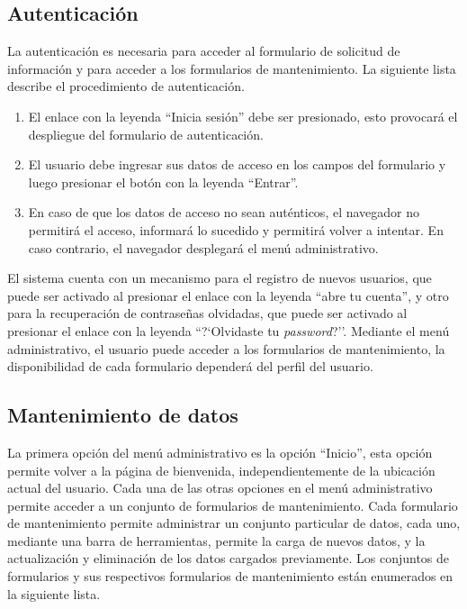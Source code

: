 \documentclass[a4paper, 9pt, conference]{article}              %
\begin{document}
\subsection{Autenticaci\'on}

La autenticaci\'on es necesaria para acceder al formulario de solicitud de informaci\'on y para acceder a los formularios de mantenimiento. La siguiente lista describe el procedimiento de autenticaci\'on.

\begin{enumerate}
	\item El enlace con la leyenda ``Inicia sesi\'on'' debe ser presionado, esto provocar\'a el despliegue del formulario de autenticaci\'on.
	\item El usuario debe ingresar sus datos de acceso en los campos del formulario y luego presionar el bot\'on con la leyenda ``Entrar''.
	\item En caso de que los datos de acceso no sean aut\'enticos, el navegador no permitir\'a el acceso, informar\'a lo sucedido y permitir\'a volver a intentar. En caso contrario, el navegador desplegar\'a el men\'u administrativo.
\end{enumerate}

El sistema cuenta con un mecanismo para el registro de nuevos usuarios, que puede ser activado al presionar el enlace con la leyenda ``abre tu cuenta'', y otro para la recuperaci\'on de contrase\~nas olvidadas, que puede ser activado al presionar el enlace con la leyenda ``?`Olvidaste tu \emph{password}?''. Mediante el men\'u administrativo, el usuario puede acceder a los formularios de mantenimiento, la disponibilidad de cada formulario depender\'a del perfil del usuario.

\subsection{Mantenimiento de datos}
 
La primera opci\'on del men\'u administrativo es la opci\'on ``Inicio'', esta opci\'on permite volver a la p\'agina de bienvenida, independientemente de la ubicaci\'on actual del usuario. Cada una de las otras opciones en el men\'u administrativo permite acceder a un conjunto de formularios de mantenimiento. Cada formulario de mantenimiento permite administrar un conjunto particular de datos, cada uno, mediante una barra de herramientas, permite la carga de nuevos datos, y la actualizaci\'on y eliminaci\'on de los datos cargados previamente. Los conjuntos de formularios y sus respectivos formularios de mantenimiento est\'an enumerados en la siguiente lista.
	
\end{document}

